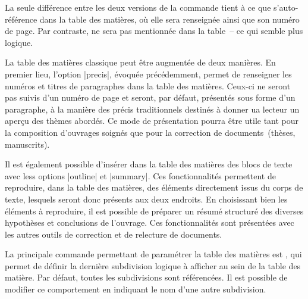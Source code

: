 \begin{macro}
	\tableofcontents %
	\tableofcontents* %
\end{macro}

La seule différence entre les deux versions de la commande tient à ce que  s'auto-référence dans la table des matières, où elle sera renseignée ainsi que son numéro de page. Par contraste,  ne sera pas mentionnée dans la table~-- ce qui semble plus logique.

La table des matières classique peut être augmentée de deux manières. En premier lieu, l'option |precis|, évoquée précédemment, permet de renseigner les numéros et titres de paragraphes dans la table des matières. Ceux-ci ne seront pas suivis d'un numéro de page et seront, par défaut, présentés sous forme d'un paragraphe, à la manière des précis traditionnels destinés à donner ua lecteur un aperçu des thèmes abordés. Ce mode de présentation pourra être utile tant pour la composition d'ouvrages soignés que pour la correction de documents~(thèses, manuscrits).

Il est également possible d'insérer dans la table des matières des blocs de texte avec less options |outline| et |summary|. Ces fonctionnalités permettent de reproduire, dans la table des matières, des éléments directement issus du corps de texte, lesquels seront donc présents aux deux endroits. En choisissant bien les éléments à reproduire, il est possible de préparer un résumé structuré des diverses hypothèses et conclusions de l'ouvrage. Ces fonctionnalités sont présentées avec les autres outils de correction et de relecture de documents.

La principale commande permettant de paramétrer la table des matières est , qui permet de définir la dernière subdivision logique à afficher au sein de la table des matière. Par défaut, toutes les subdivisions sont référencées. Il est possible de modifier ce comportement en indiquant le nom d'une autre subdivision.


